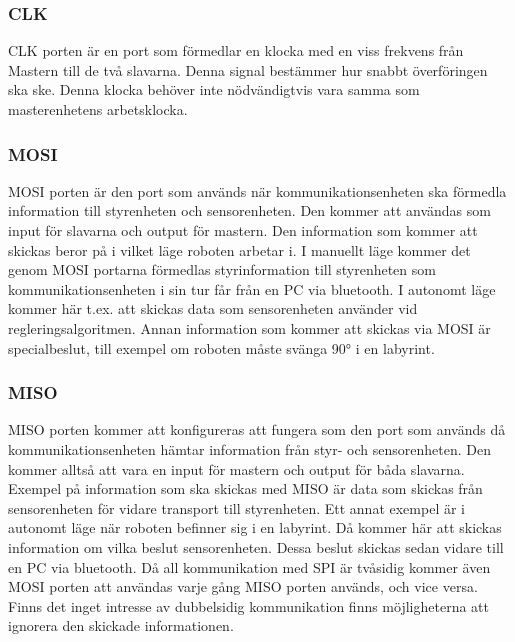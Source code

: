 \subsubsection{CLK}

CLK porten är en port som förmedlar en klocka med en viss frekvens från Mastern till de två slavarna. Denna signal bestämmer hur snabbt överföringen ska ske. Denna klocka behöver inte nödvändigtvis vara samma som masterenhetens arbetsklocka.

\subsubsection{MOSI}
MOSI porten är den port som används när kommunikationsenheten ska förmedla information till styrenheten och sensorenheten. Den kommer att användas som input för slavarna och output för mastern. Den information som kommer att skickas beror på i vilket läge roboten arbetar i. I manuellt läge kommer det genom MOSI portarna förmedlas styrinformation till styrenheten som kommunikationsenheten i sin tur får från en PC via bluetooth. I autonomt läge kommer här t.ex. att skickas data som sensorenheten använder vid regleringsalgoritmen. Annan information som kommer att skickas via MOSI är specialbeslut, till exempel om roboten måste svänga 90° i en labyrint.

\subsubsection{MISO}
MISO porten kommer att konfigureras att fungera som den port som används då kommunikationsenheten hämtar information från styr- och sensorenheten. Den kommer alltså att vara en input för mastern och output för båda slavarna. Exempel på information som ska skickas med MISO är data som skickas från sensorenheten för vidare transport till styrenheten. Ett annat exempel är i autonomt läge när roboten befinner sig i en labyrint. Då kommer här att skickas information om vilka beslut sensorenheten. Dessa beslut skickas sedan vidare till en PC via bluetooth.
Då all kommunikation med SPI är tvåsidig kommer även MOSI porten att användas varje gång MISO porten används, och vice versa. Finns det inget intresse av dubbelsidig kommunikation finns möjligheterna att ignorera den skickade informationen.

